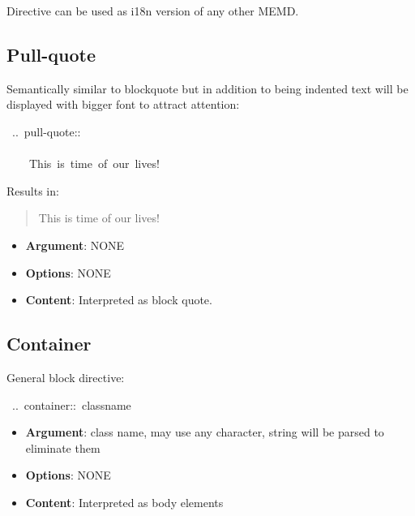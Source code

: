 \documentclass[12pt]{article}
\newenvironment{pullquote}{\begin{quotation}\Large}{\end{quotation}}
\begin{document}
Directive can be used as i18n version of any other MEMD.

\hypertarget{lpull-quote}{}
\subsection{Pull-quote}

Semantically similar to blockquote but in addition to being indented text will
be displayed with bigger font to attract attention:

\begin{ttfamily}\begin{flushleft}
\mbox{~..~pull-quote::~}\\
\mbox{}\\
\mbox{~~~~This~is~time~of~our~lives!}\\
\end{flushleft}\end{ttfamily}

Results in:

\begin{pullquote}
 This is time of our lives!
\end{pullquote}
\begin{itemize}
\item
\textbf{Argument}: NONE

\item
\textbf{Options}: NONE

\item
\textbf{Content}: Interpreted as block quote.
\end{itemize}
\hypertarget{lcontainer}{}
\subsection{Container}

General block directive:

\begin{ttfamily}\begin{flushleft}
\mbox{~..~container::~classname}\\
\end{flushleft}\end{ttfamily}

\begin{itemize}
\item
\textbf{Argument}: class name, may use any character, string will be parsed to
eliminate them

\item
\textbf{Options}: NONE

\item
\textbf{Content}: Interpreted as body elements
\end{itemize}
\end{document}
